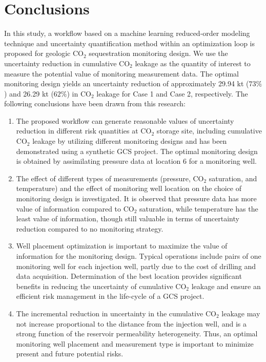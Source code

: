 \documentclass[a4paper,fleqn]{cas-sc}
\begin{document}
\section{Conclusions}
In this study, a workflow based on a machine learning reduced-order modeling technique and uncertainty quantification method within an optimization loop is proposed for geologic CO$_2$ sequestration monitoring design. We use the uncertainty reduction in cumulative CO$_2$ leakage as the quantity of interest to measure the potential value of monitoring measurement data. The optimal monitoring design yields an uncertainty reduction of approximately 29.94 kt ($73\%$) and 26.29 kt ($62\%$) in CO$_2$ leakage for Case 1 and Case 2, respectively. The following conclusions have been drawn from this research:
\begin{enumerate}
    \item The proposed workflow can generate reasonable values of uncertainty reduction in different risk quantities at CO$_2$ storage site, including cumulative CO$_2$ leakage by utilizing different monitoring designs and has been demonstrated using a synthetic GCS project. The optimal monitoring design is obtained by assimilating pressure data at location 6 for a monitoring well.
    
    \item The effect of different types of measurements (pressure, CO$_2$ saturation, and temperature) and the effect of monitoring well location on the choice of monitoring design is investigated. It is observed that pressure data has more value of information compared to CO$_2$ saturation, while temperature has the least value of information, though still valuable in terms of uncertainty reduction compared to no monitoring strategy.
    
    \item Well placement optimization is important to maximize the value of information for the monitoring design. Typical operations include pairs of one monitoring well for each injection well, partly due to the cost of drilling and data acquisition. Determination of the best location provides significant benefits in reducing the uncertainty of cumulative CO$_2$ leakage and ensure an efficient risk management in the life-cycle of a GCS project.
    
    \item The incremental reduction in uncertainty in the cumulative CO$_2$ leakage may not increase proportional to the distance from the injection well, and is a strong function of the reservoir permeability heterogeneity. Thus, an optimal monitoring well placement and measurement type is important to minimize present and future potential risks.
    

\end{enumerate}
\end{document}
